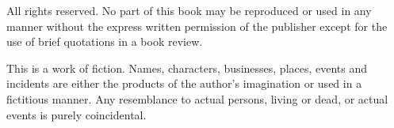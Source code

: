 \infopage{\title}

\begingroup

\parindent=0pt

\publishercredit

\colophonfont

\bigskip
\pubcopyright

\bigskip
\pubidentification

\bigskip
All rights reserved.
No part of this book may be reproduced or used in any manner
without the express written permission of the publisher
except for the use of brief
quotations in a book review.

\bigskip
This is a work of fiction.
Names, characters, businesses, places, events and incidents
are either the products of the author's imagination
or used in a fictitious manner.
Any resemblance to actual persons, living or dead,
or actual events
is purely coincidental.

\endgroup

